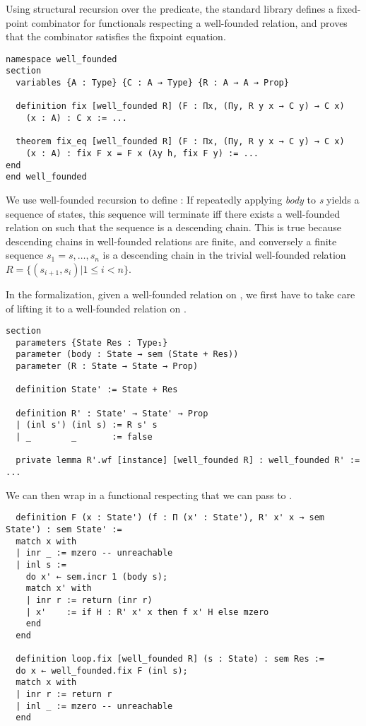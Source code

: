 Using structural recursion over the  predicate, the standard library
defines a fixed-point combinator for functionals respecting a well-founded
relation, and proves that the combinator satisfies the fixpoint equation.

\begin{verbatim}
namespace well_founded
section
  variables {A : Type} {C : A → Type} {R : A → A → Prop}

  definition fix [well_founded R] (F : Πx, (Πy, R y x → C y) → C x)
    (x : A) : C x := ...

  theorem fix_eq [well_founded R] (F : Πx, (Πy, R y x → C y) → C x)
    (x : A) : fix F x = F x (λy h, fix F y) := ...
end
end well_founded
\end{verbatim}

We use well-founded recursion to define : If repeatedly applying
\emph{body} to \emph{s} yields a sequence of states,
this sequence will terminate iff there exists a well-founded relation on
 such that the sequence is a descending chain.
This is true because descending chains in well-founded relations are finite, and
conversely a finite sequence $s_1 = s, \dots, s_n$ is a descending chain in the
trivial well-founded relation $R = \{(s_{i+1}, s_i) | 1 \le i < n\}$.

In the formalization, given a well-founded relation  on , we first have to take care of lifting it to a well-founded relation  on .

\begin{verbatim}
section
  parameters {State Res : Type₁}
  parameter (body : State → sem (State + Res))
  parameter (R : State → State → Prop)

  definition State' := State + Res

  definition R' : State' → State' → Prop
  | (inl s') (inl s) := R s' s
  | _        _       := false

  private lemma R'.wf [instance] [well_founded R] : well_founded R' := ...
\end{verbatim}

We can then wrap  in a functional respecting  that we can pass to .

\begin{verbatim}
  definition F (x : State') (f : Π (x' : State'), R' x' x → sem State') : sem State' :=
  match x with
  | inr _ := mzero -- unreachable
  | inl s :=
    do x' ← sem.incr 1 (body s);
    match x' with
    | inr r := return (inr r)
    | x'    := if H : R' x' x then f x' H else mzero
    end
  end

  definition loop.fix [well_founded R] (s : State) : sem Res :=
  do x ← well_founded.fix F (inl s);
  match x with
  | inr r := return r
  | inl _ := mzero -- unreachable
  end
\end{verbatim}

